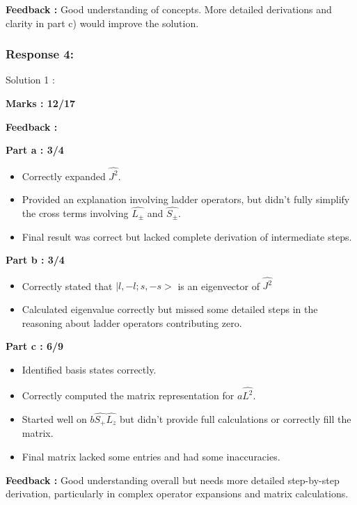 \documentclass[a4paper,11pt]{article}
\begin{document}
\textbf{Feedback :}
Good understanding of concepts. More detailed derivations and clarity in part c) would improve the solution.



\subsubsection*{Response 4:}


Solution 1 :

\textbf{Marks : 12/17}

\textbf{Feedback : }

\textbf{Part a : 3/4}

\begin{itemize}
    \item Correctly expanded $\hat{J^2}$.
    \item Provided an explanation involving ladder operators, but didn't fully simplify the cross terms involving $\hat{L_\pm}$ and $\hat{S_\pm}$.
    \item Final result was correct but lacked complete derivation of intermediate steps.
\end{itemize}


\textbf{Part b : 3/4}

\begin{itemize}
    \item Correctly stated that $|l, -l;s, -s>$ is an eigenvector of $\hat{J^2}$
    \item Calculated eigenvalue correctly but missed some detailed steps in the reasoning about ladder operators contributing zero.
\end{itemize}


\textbf{Part c : 6/9}

\begin{itemize}
    \item Identified basis states correctly.
    \item Correctly computed the matrix representation for $a\hat{L^2}$.
    \item Started well on $b\hat{S_+}\hat{L_z}$ but didn't provide full calculations or correctly fill the matrix.
    \item Final matrix lacked some entries and had some inaccuracies.
\end{itemize}

\textbf{Feedback :}
Good understanding overall but needs more detailed step-by-step derivation, particularly in complex operator expansions and matrix calculations.
\end{document}
